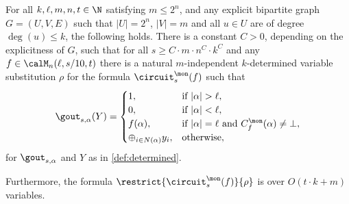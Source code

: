 \begin{lemma}
  \label{lem:restriction-monotone}
  For all $k, \ell, m, n, t \in \N$ satisfying $m \le 2^n$, and any
  explicit bipartite graph $G = (U, V, E)$ such that $|U| = 2^n$,
  $|V| = m$ and all $u \in U$ are of degree $\deg(u) \le k$, the
  following holds.  There is a constant $C > 0$, depending on the
  explicitness of $G$, such that for all
  $s \ge C \cdot m \cdot n^C \cdot k^C$ and any
  $f \in \calM_n(\ell, s/10, t)$ there is a natural $m$-independent
  $k$-determined variable substitution $\rho$ for the formula
  $\circuit^\mon_s(f)$ such that
  \begin{align*}
    \gout_{s, \alpha}(Y) =
    \begin{cases}
      1, &\text{if~} |\alpha| > \ell,\\
      0, &\text{if~} |\alpha| < \ell,\\
      f(\alpha), &\text{if~} |\alpha| = \ell \text{~and~} C_f^\mon(\alpha) \neq \bot,\\
      \oplus_{i \in N(\alpha)} y_i, &\text{otherwise},\\
    \end{cases}
  \end{align*}
  for $\gout_{s, \alpha}$ and $Y$ as in \cref{def:determined}.

  Furthermore, the formula $\restrict{\circuit^\mon_s(f)}{\rho}$ is
  over $O(t \cdot k + m)$ variables.
\end{lemma}

